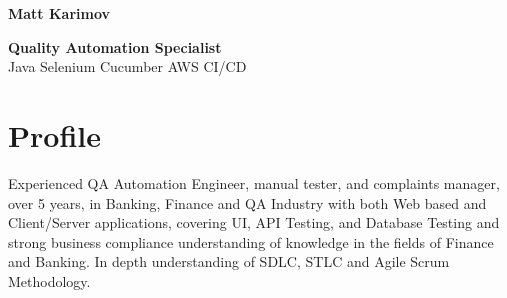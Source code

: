 \documentclass[11pt,a4paper]{article}
\begin{document}
    \begin{center}
        \textbf{\LARGE Matt Karimov} \\
        {\small \address{Manchester, UK} \textbar{}
         \textbar{}
         \textbar{}
         \textbar{}
        }

        {\Large \textbf{Quality Automation Specialist}}\\
        \small Java \textbar{} Selenium \textbar{} Cucumber \textbar{} AWS \textbar{} CI/CD
    \end{center}

    \section*{Profile}
    Experienced QA Automation Engineer, manual tester, and complaints manager, over 5 years, in Banking, Finance and QA Industry with both Web based and Client/Server applications, covering UI, API Testing, and Database Testing and strong business compliance understanding of knowledge in the fields of Finance and Banking. In depth understanding of SDLC, STLC and Agile Scrum Methodology.
\end{document}
